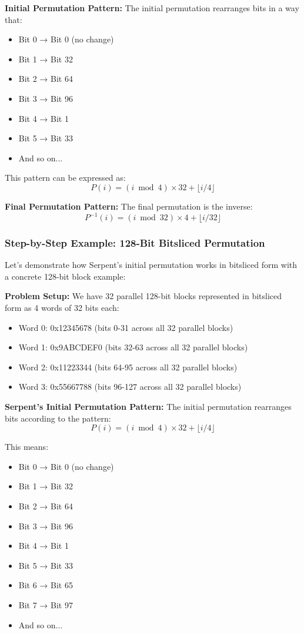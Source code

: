 \documentclass[12pt,a4paper]{article}
\begin{document}
\textbf{Initial Permutation Pattern:}
The initial permutation rearranges bits in a way that:
\begin{itemize}
    \item Bit 0 → Bit 0 (no change)
    \item Bit 1 → Bit 32
    \item Bit 2 → Bit 64
    \item Bit 3 → Bit 96
    \item Bit 4 → Bit 1
    \item Bit 5 → Bit 33
    \item And so on...
\end{itemize}

This pattern can be expressed as:
$$P(i) = (i \bmod 4) \times 32 + \lfloor i / 4 \rfloor$$

\textbf{Final Permutation Pattern:}
The final permutation is the inverse:
$$P^{-1}(i) = (i \bmod 32) \times 4 + \lfloor i / 32 \rfloor$$

\subsubsection{Step-by-Step Example: 128-Bit Bitsliced Permutation}
Let's demonstrate how Serpent's initial permutation works in bitsliced form with a concrete 128-bit block example:

\textbf{Problem Setup:}
We have 32 parallel 128-bit blocks represented in bitsliced form as 4 words of 32 bits each:
\begin{itemize}
    \item Word 0: 0x12345678 (bits 0-31 across all 32 parallel blocks)
    \item Word 1: 0x9ABCDEF0 (bits 32-63 across all 32 parallel blocks)
    \item Word 2: 0x11223344 (bits 64-95 across all 32 parallel blocks)
    \item Word 3: 0x55667788 (bits 96-127 across all 32 parallel blocks)
\end{itemize}

\textbf{Serpent's Initial Permutation Pattern:}
The initial permutation rearranges bits according to the pattern:
$$P(i) = (i \bmod 4) \times 32 + \lfloor i / 4 \rfloor$$

This means:
\begin{itemize}
    \item Bit 0 → Bit 0 (no change)
    \item Bit 1 → Bit 32
    \item Bit 2 → Bit 64
    \item Bit 3 → Bit 96
    \item Bit 4 → Bit 1
    \item Bit 5 → Bit 33
    \item Bit 6 → Bit 65
    \item Bit 7 → Bit 97
    \item And so on...
\end{itemize}
\end{document}
